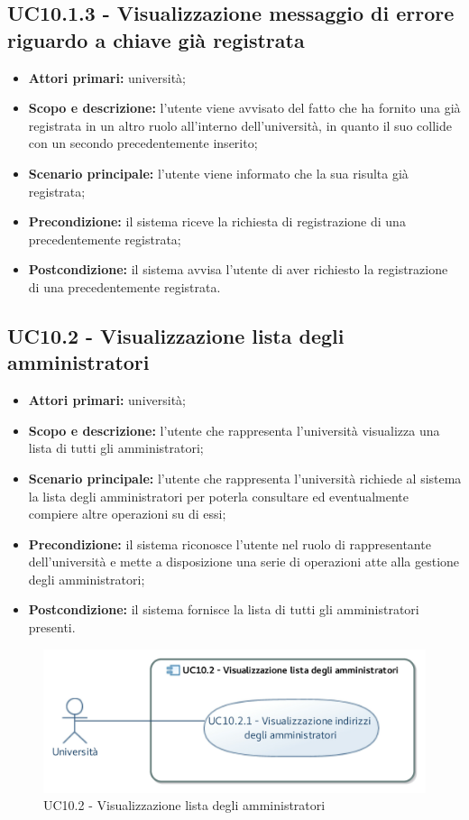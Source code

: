 \documentclass[AnalisiDeiRequisiti.tex]{subfiles}
\begin{document}
\subsection{UC10.1.3 - Visualizzazione messaggio di errore riguardo a chiave già registrata}
\begin{itemize}
	\item \textbf{Attori primari:} università;
	\item \textbf{Scopo e descrizione:} l'utente viene avvisato del fatto che ha fornito una  già registrata in un altro ruolo all'interno dell'università, in quanto il suo  collide con un secondo precedentemente inserito;
	\item \textbf{Scenario principale:} l'utente viene informato che la sua  risulta già registrata;
	\item \textbf{Precondizione:} il sistema riceve la richiesta di registrazione di una  precedentemente registrata;
	\item \textbf{Postcondizione:} il sistema avvisa l'utente di aver richiesto la registrazione di una  precedentemente registrata.
\end{itemize}


\subsection{UC10.2 - Visualizzazione lista degli amministratori}
\begin{itemize}
	\item \textbf{Attori primari:} università;
	\item \textbf{Scopo e descrizione:} l'utente che rappresenta l'università visualizza una lista di tutti gli amministratori;
	\item \textbf{Scenario principale:} l'utente che rappresenta l'università richiede al sistema la lista degli amministratori per poterla consultare ed eventualmente compiere altre operazioni su di essi;
	\item \textbf{Precondizione:} il sistema riconosce l'utente nel ruolo di rappresentante dell'università e mette a disposizione una serie di operazioni atte alla gestione degli amministratori; 
	\item \textbf{Postcondizione:} il sistema fornisce la lista di tutti gli amministratori presenti.
\end{itemize}

\begin{figure}[H]
	\centering
	\includegraphics[width=0.7\linewidth]{UC10_2.jpg}
	\caption{UC10.2 - Visualizzazione lista degli amministratori}
	\label{UC10.2 - Visualizzazione lista degli amministratori}
\end{figure}
\end{document}
